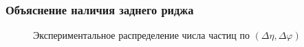 \documentclass{beamer}
\renewcommand{\l}{\left( }
\renewcommand{\r}{\right) }
\renewcommand{\phi}{\varphi}
\newcommand{\br}[1]{\l {#1} \r}
\begin{document}
\begin{frame}[fragile]
\frametitle{Объяснение наличия заднего риджа}
\begin{minipage}[h]{0.48\linewidth}
\begin{figure}
\caption{Экспериментальное распределение числа частиц по $\br{\Delta \eta, \Delta \phi}$  }
\end{figure}
\end{minipage}
\begin{minipage}[h]{0.48\linewidth}
\begin{figure}
\end{figure}
\begin{figure}

\end{figure}
\end{minipage}
\end{frame}
\end{document}
